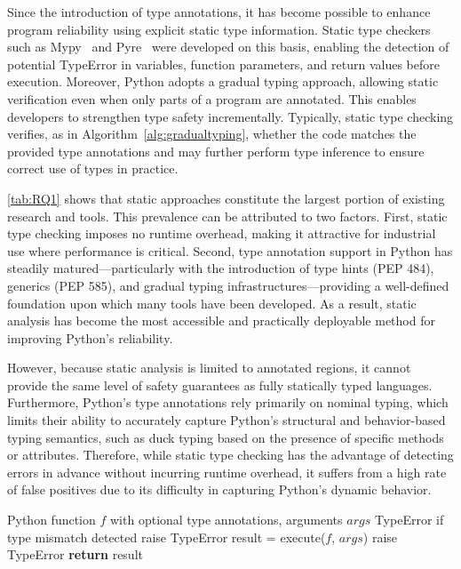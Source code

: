 Since the introduction of type annotations, it has become possible to enhance
program reliability using explicit static type information.
Static type checkers such as Mypy~\cite{mypy} and Pyre~\cite{pyre} were
developed on this basis, enabling the detection of potential TypeError in
variables, function parameters, and return values before execution.
Moreover, Python adopts a gradual typing approach, allowing static verification
even when only parts of a program are annotated.
This enables developers to strengthen type safety incrementally.
Typically, static type checking verifies, as in
Algorithm~\autoref{alg:gradualtyping}, whether the code matches the provided
type annotations and may further perform type inference to ensure correct use
of types in practice.

\autoref{tab:RQ1} shows that static approaches constitute the largest portion
of existing research and tools.
This prevalence can be attributed to two factors.
First, static type checking imposes no runtime overhead, making it attractive
for industrial use where performance is critical.
Second, type annotation support in Python has steadily matured—particularly
with the introduction of type hints (PEP 484), generics (PEP 585), and gradual
typing infrastructures—providing a well-defined foundation upon which many
tools have been developed.
As a result, static analysis has become the most accessible and practically
deployable method for improving Python’s reliability.

However, because static analysis is limited to annotated regions, it cannot
provide the same level of safety guarantees as fully statically typed
languages. Furthermore, Python’s type annotations rely primarily on nominal
typing, which limits their ability to accurately capture Python’s structural
and behavior-based typing semantics, such as duck typing based on the presence
of specific methods or attributes. Therefore, while static type checking has
the advantage of detecting errors in advance without incurring runtime
overhead, it suffers from a high rate of false positives due to its difficulty
in capturing Python’s dynamic behavior.

\begin{algorithm}[t]
\caption{GradualTypeCheck}
\begin{algorithmic}[1]
\REQUIRE Python function $f$ with optional type annotations, arguments $args$
\ENSURE TypeError if type mismatch detected
            \STATE raise TypeError
        \ENDIF
    \ENDIF
\ENDFOR
\STATE result = execute($f$, $args$)
        \STATE raise TypeError
    \ENDIF
\ENDIF
\STATE \textbf{return} result
\end{algorithmic}
\label{alg:gradualtyping}
\end{algorithm}


